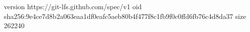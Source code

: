 version https://git-lfs.github.com/spec/v1
oid sha256:9e4ce7d8b2a063eaa1df0eafc5aeb80b4f477f8c1fb9f0c0ffd6fb76c4d8da37
size 262240
